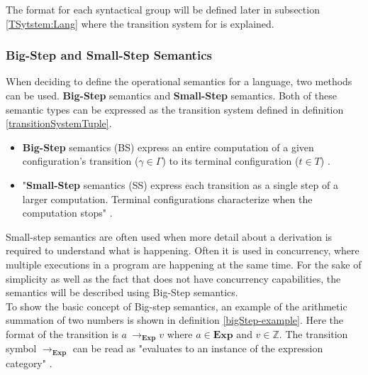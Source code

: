 \noindent The format for each syntactical group will be defined later in subsection \ref{TSytstem:Lang} where the transition system for \lang is explained.



\subsubsection{Big-Step and Small-Step Semantics} \label{big-step_Chapter}
When deciding to define the operational semantics for a language, two methods can be used. \textbf{Big-Step} semantics and \textbf{Small-Step} semantics. Both of these semantic types can be expressed as the transition system defined in definition \ref{transitionSystemTuple}.

\begin{itemize}
    \item \textbf{Big-Step} semantics (BS) express an entire computation of a given configuration's transition ($\gamma \in \Gamma$) to its terminal configuration ($t \in T$) \cite{SS_lecture_8}. 
    \item "\textbf{Small-Step} semantics (SS) express each transition as a
    single step of a larger computation. Terminal configurations
    characterize when the computation stops" \cite{SS_lecture_8}.
\end{itemize}

\noindent
Small-step semantics are often used when more detail about a derivation is required to understand what is happening. Often it is used in concurrency, where multiple executions in a program are happening at the same time\cite{SS_lecture_12}. For the sake of simplicity as well as the fact that \lang does not have concurrency capabilities, the semantics will be described using Big-Step semantics. \\

To show the basic concept of Big-step semantics, an example of the arithmetic summation of two numbers is shown in definition \ref{bigStep-example}. Here the format of the transition is $a \ \rightarrow _{\textbf{Exp}} v$ where $a \in \textbf{Exp}$ and $v \in \mathbb{Z}$. The transition symbol $\rightarrow _{\textbf{Exp}}$ can be read as "evaluates to an instance of the expression category" \cite{SS_lecture_8}.

